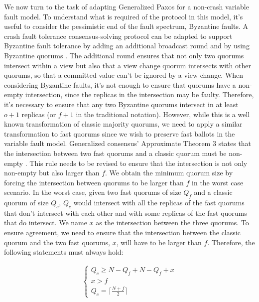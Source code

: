 \documentclass[runningheads,a4paper]{llncs}
\begin{document}
\newpage
We now turn to the task of adapting Generalized Paxos for a non-crash variable fault model. To understand what is required of the protocol in this model, it's useful to consider the pessimistic end of the fault spectrum, Byzantine faults. A crash fault tolerance consensus-solving protocol can be adapted to support Byzantine fault tolerance by adding an additional broadcast round and by using Byzantine quorums \cite{Cachin2009}. The additional round ensures that not only two quorums intersect within a view but also that a view change quorum intersects with other quorums, so that a committed value can't be ignored by a view change.
When considering Byzantine faults, it's not enough to ensure that quorums have a non-empty intersection, since the replicas in the intersection may be faulty. Therefore, it's necessary to ensure that any two Byzantine quorums intersect in at least $o+1$ replicas (or $f+1$ in the traditional notation). However, while this is a well known transformation of classic majority quorums, we need to apply a similar transformation to fast quorums since we wish to preserve fast ballots in the variable fault model. Generalized consensus' Approximate Theorem 3 states that the intersection between two fast quorums and a classic quorum must be non-empty \cite{Lamport2005}. This rule needs to be revised to ensure that the intersection is not only non-empty but also larger than $f$. We obtain the minimum quorum size by forcing the intersection between quorums to be larger than $f$ in the worst case scenario. In the worst case, given two fast quorums of size $Q_f$ and a classic quorum of size $Q_c$, $Q_c$ would intersect with all the replicas of the fast quorums that don't intersect with each other and with some replicas of the fast quorums that do intersect. We name $x$ as the intersection between the three quorums. To ensure agreement, we need to ensure that the intersection between the classic quorum and the two fast quorums, $x$, will have to be larger than $f$. Therefore, the following statements must always hold: \par

\begin{gather*}
	\begin{cases}
		Q_c \geq N - Q_f + N-Q_f + x \\
		x > f \\
		Q_c = \lceil \frac{N+f}{2}\rceil
	\end{cases} \\ 
\end{gather*}
\end{document}
